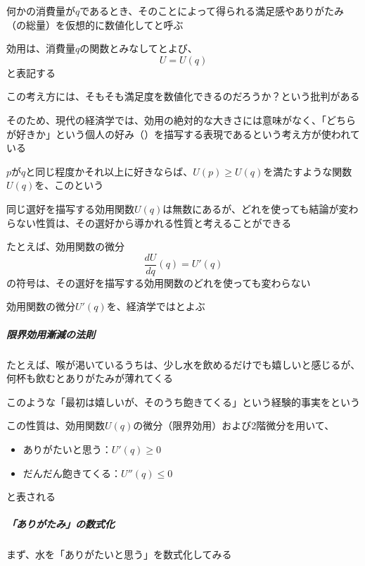 \documentclass[../book_jiriki_calc]{subfiles}
\begin{document}
何かの消費量が$q$であるとき、そのことによって得られる満足感やありがたみ（の総量）を仮想的に数値化してと呼ぶ

効用は、消費量$q$の関数とみなしてとよび、
\begin{equation}
  U=U(q)
\end{equation}
と表記する

\br

この考え方には、そもそも満足度を数値化できるのだろうか？という批判がある

そのため、現代の経済学では、効用の絶対的な大きさには意味がなく、「どちらが好きか」という個人の好み（）を描写する表現であるという考え方が使われている

$p$が$q$と同じ程度かそれ以上に好きならば、$U(p) \geq U(q)$を満たすような関数$U(q)$を、このという

\br

同じ選好を描写する効用関数$U(q)$は無数にあるが、どれを使っても結論が変わらない性質は、その選好から導かれる性質と考えることができる

\br

たとえば、効用関数の微分
\begin{equation}
  \frac{dU}{dq}(q) = U'(q)
\end{equation}
の符号は、その選好を描写する効用関数のどれを使っても変わらない

効用関数の微分$U'(q)$を、経済学ではとよぶ

\sectionline

\subparagraph{限界効用漸減の法則}

たとえば、喉が渇いているうちは、少し水を飲めるだけでも嬉しいと感じるが、何杯も飲むとありがたみが薄れてくる

\br

このような「最初は嬉しいが、そのうち飽きてくる」という経験的事実をという

\br

この性質は、効用関数$U(q)$の微分（限界効用）および2階微分を用いて、
\begin{itemize}
  \item ありがたいと思う：$U'(q) \geq 0$
  \item だんだん飽きてくる：$U''(q) \leq 0$
\end{itemize}
と表される

\sectionline

\subparagraph{「ありがたみ」の数式化}

まず、水を「ありがたいと思う」を数式化してみる
\end{document}
